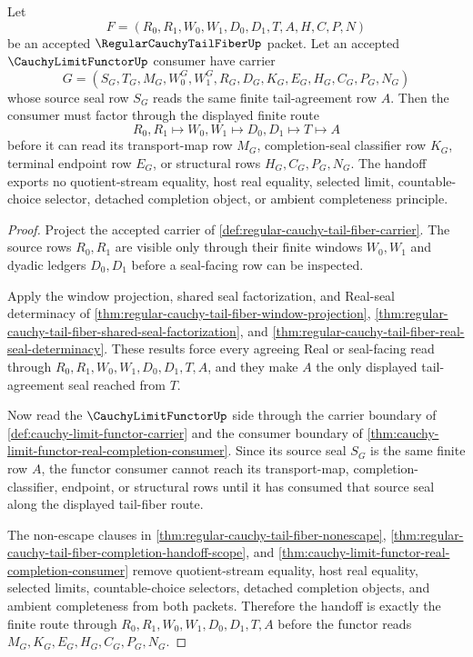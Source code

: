 \begin{theorem}
\label{thm:regular-cauchy-tail-fiber-limit-seal-functor-handoff}
Let
$$
F=(R_0,R_1,W_0,W_1,D_0,D_1,T,A,H,C,P,N)
$$
be an accepted $\RegularCauchyTailFiberUp$ packet. Let an accepted $\CauchyLimitFunctorUp$ consumer have carrier
$$
G=(S_G,T_G,M_G,W^G_0,W^G_1,R_G,D_G,K_G,E_G,H_G,C_G,P_G,N_G)
$$
whose source seal row $S_G$ reads the same finite tail-agreement row $A$. Then the consumer must factor through the displayed finite route
$$
R_0,R_1 \longmapsto W_0,W_1 \longmapsto D_0,D_1 \longmapsto T \longmapsto A
$$
before it can read its transport-map row $M_G$, completion-seal classifier row $K_G$, terminal endpoint row $E_G$, or structural rows $H_G,C_G,P_G,N_G$. The handoff exports no quotient-stream equality, host real equality, selected limit, countable-choice selector, detached completion object, or ambient completeness principle.
\end{theorem}
\begin{proof}
Project the accepted carrier of \autoref{def:regular-cauchy-tail-fiber-carrier}. The source rows $R_0,R_1$ are visible only through their finite windows $W_0,W_1$ and dyadic ledgers $D_0,D_1$ before a seal-facing row can be inspected.

Apply the window projection, shared seal factorization, and Real-seal determinacy of \autoref{thm:regular-cauchy-tail-fiber-window-projection}, \autoref{thm:regular-cauchy-tail-fiber-shared-seal-factorization}, and \autoref{thm:regular-cauchy-tail-fiber-real-seal-determinacy}. These results force every agreeing Real or seal-facing read through $R_0,R_1,W_0,W_1,D_0,D_1,T,A$, and they make $A$ the only displayed tail-agreement seal reached from $T$.

Now read the $\CauchyLimitFunctorUp$ side through the carrier boundary of \autoref{def:cauchy-limit-functor-carrier} and the consumer boundary of \autoref{thm:cauchy-limit-functor-real-completion-consumer}. Since its source seal $S_G$ is the same finite row $A$, the functor consumer cannot reach its transport-map, completion-classifier, endpoint, or structural rows until it has consumed that source seal along the displayed tail-fiber route.

The non-escape clauses in \autoref{thm:regular-cauchy-tail-fiber-nonescape}, \autoref{thm:regular-cauchy-tail-fiber-completion-handoff-scope}, and \autoref{thm:cauchy-limit-functor-real-completion-consumer} remove quotient-stream equality, host real equality, selected limits, countable-choice selectors, detached completion objects, and ambient completeness from both packets. Therefore the handoff is exactly the finite route through $R_0,R_1,W_0,W_1,D_0,D_1,T,A$ before the functor reads $M_G,K_G,E_G,H_G,C_G,P_G,N_G$.
\end{proof}

